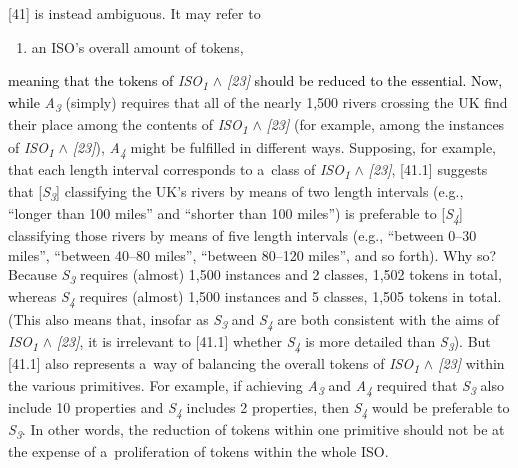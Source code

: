 [41] is instead ambiguous. It may refer to



\begin{enumerate}

\item an ISO's overall amount of tokens,

\end{enumerate}

\textcolor{black}{meaning that the tokens of }\textit{ISO}\textit{\textsubscript{1}} \textit{${\wedge}$ [23]}\textcolor{black}{ should be reduced to the essential. Now, while }\textit{A}\textit{\textsubscript{3}} (simply) requires that all of the nearly 1,500 rivers crossing the UK find their place among the contents of \textit{ISO}\textit{\textsubscript{1}} \textit{\textcolor[rgb]{0.1254902,0.12941177,0.14117648}{${\wedge}$}} \textit{[23]} (for example, among the instances of \textit{ISO}\textit{\textsubscript{1}} \textit{\textcolor[rgb]{0.1254902,0.12941177,0.14117648}{${\wedge}$}} \textit{[23]}), \textit{A}\textit{\textsubscript{4}} might be fulfilled in different ways. Supposing, for example, that each length interval corresponds to a~class of \textit{ISO}\textit{\textsubscript{1}} \textit{\textcolor[rgb]{0.1254902,0.12941177,0.14117648}{${\wedge}$}} \textit{[23]}, [41.1] suggests that [\textit{S}\textit{\textsubscript{3}}] classifying the UK's rivers by means of two length intervals (e.g., ``longer than 100 miles'' and ``shorter than 100 miles'') is preferable to [\textit{S}\textit{\textsubscript{4}}] classifying those rivers by means of five length intervals (e.g., ``between 0–30 miles'', ``between 40–80 miles'', ``between 80–120 miles'', and so forth). Why so? Because \textit{S}\textit{\textsubscript{3}} requires (almost) 1,500 instances and 2 classes, 1,502 tokens in total, whereas \textit{S}\textit{\textsubscript{4}} requires (almost) 1,500 instances and 5 classes, 1,505 tokens in total. (This also means that, insofar as \textit{S}\textit{\textsubscript{3}} and \textit{S}\textit{\textsubscript{4}} are both consistent with the aims of \textit{ISO}\textit{\textsubscript{1}} \textit{\textcolor[rgb]{0.1254902,0.12941177,0.14117648}{${\wedge}$}} \textit{[23]}, it is irrelevant to [41.1] whether \textit{S}\textit{\textsubscript{4}} is more detailed than \textit{S}\textit{\textsubscript{3}}). But [41.1] also represents a~way of balancing the overall tokens of \textit{ISO}\textit{\textsubscript{1}} \textit{${\wedge}$ [23]} within the various primitives. For example, if achieving \textit{A}\textit{\textsubscript{3}} and \textit{A}\textit{\textsubscript{4}} required that \textit{S}\textit{\textsubscript{3}} also include 10 properties and \textit{S}\textit{\textsubscript{4}} includes 2 properties, then \textit{S}\textit{\textsubscript{4}} would be preferable to \textit{S}\textit{\textsubscript{3}}. In other words, the reduction of tokens within one primitive should not be at the expense of a~proliferation of tokens within the whole ISO.



